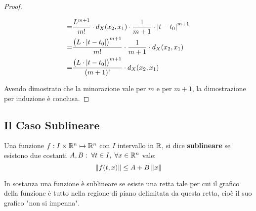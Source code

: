 \begin{theorem}
\begin{proof}
\begin{itemize}
\begin{align*}
				= &\frac{L^{m+1}}{m!} \cdot d_X(x_2,x_1)
				\cdot \frac{1}{m+1} \cdot \left|t-t_0\right|^{m+1}\\
				= &\frac{\bigl(L \cdot \left|t-t_0\right|\bigr)^{m+1}}{m!} \cdot \frac{1}{m+1} \cdot d_X(x_2,x_1)\\
				= &\frac{\bigl(L \cdot \left|t-t_0\right|\bigr)^{m+1}}{(m+1)!} \cdot d_X(x_2,x_1)\\
			\end{align*}
		\end{itemize}
		Avendo dimostrato che la minorazione vale per $m$ e per $m+1$, la dimostrazione per induzione è conclusa.
	\end{proof}
\end{theorem}
\color{black}

\subsection{Il Caso Sublineare}
\begin{definition}
	\label{def:sublineare}
	Una funzione $f:I\times\mathbb{R}^n\mapsto\mathbb{R}^n$ con $I$ intervallo in $\mathbb{R}$, si dice \textbf{sublineare} se esistono due costanti $A, B:\; \forall t \in I,\;\forall x \in \mathbb{R}^n$ vale:
	$$\left\|f(t,x)\right\|\leq A + B \left\|x\right\|$$
	\begin{note}
		In sostanza una funzione è sublineare se esiste una retta tale per cui il grafico della funzione è tutto nella regione di piano delimitata da questa retta, cioè il suo grafico "non si impenna".
		\begin{center}
		\end{center}
	\end{note}
\end{definition}
